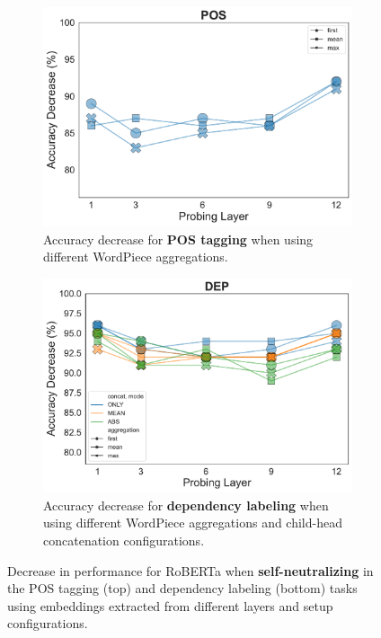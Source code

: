 \documentclass[11pt,a4paper]{article}
\begin{document}
\begin{figure}[ht]
    \centering
    \begin{subfigure}{\columnwidth}
        \centering
        \includegraphics[width=\textwidth]{configs/roberta-base_config_selection_POS.pdf}
        \caption{Accuracy decrease for \textbf{POS tagging} when using different WordPiece aggregations.}
        \label{fig:pos_selection_roberta}
    \end{subfigure}
    \begin{subfigure}{\columnwidth}
        \centering
        \includegraphics[width=\textwidth]{configs/roberta-base_config_selection_DEP.pdf}
        \caption{Accuracy decrease for \textbf{dependency labeling} when using different WordPiece aggregations and child-head concatenation configurations.}
        \label{fig:dep_selection_roberta}
    \end{subfigure}
    \caption{Decrease in performance for RoBERTa when \textbf{self-neutralizing} in the POS tagging (top) and dependency labeling (bottom) tasks using embeddings extracted from different layers and setup configurations.}
    \label{fig:selection_roberta}
\end{figure}
\end{document}
